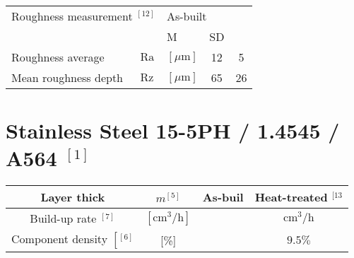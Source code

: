 \documentclass[10pt]{article}
\begin{document}
\begin{center}
\begin{tabular}{|l|ll|c|c|}
\hline
\multicolumn{2}{|l|}{Roughness measurement ${ }^{[12]}$} & \multicolumn{2}{l|}{As-built} &  \\
\cline { 3 - 5 }
 &  & M & SD &  \\
\hline
Roughness average & $\mathrm{Ra}$ & $[\mu \mathrm{m}]$ & 12 & 5 \\
\hline
Mean roughness depth & $\mathrm{Rz}$ & $[\mu \mathrm{m}]$ & 65 & 26 \\
\hline
\end{tabular}
\end{center}

\section*{Stainless Steel 15-5PH / 1.4545 / A564 ${ }^{[1]}$}
\begin{center}
\begin{tabular}{|c|c|c|c|}
\hline
Layer thick & $m^{[5]}$ & As-buil & Heat-treated ${ }^{[13}$ \\
\hline
Build-up rate ${ }^{[7]}$ & $\left[\mathrm{cm}^{3} / \mathrm{h}\right]$ &  & $\mathrm{cm}^{3} / \mathrm{h}$ \\
\hline
Component density $\left[{ }^{[6]}\right.$ & [\%] &  & $9.5 \%$ \\
\hline
\end{tabular}
\end{center}
\end{document}

